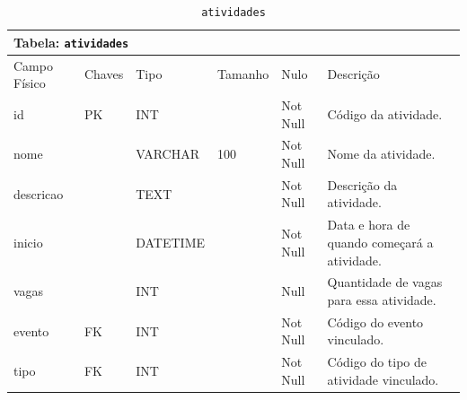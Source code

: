\documentclass[12pt,a4paper]{article}
\begin{document}
\begin{center}
\begin{table}[h!]
	\caption{\texttt{atividades}}
	\label{tabela:atividades}
	\begin{tabular}{|p{2.5cm}|p{1cm}|p{1.25cm}|p{1.75cm}|p{1.25cm}|p{5cm}|}\hline	
		\multicolumn{6}{|p{16cm}|}{\cellcolor{cinzaClaro}  \centering Tabela: \texttt{atividades}} \\ \hline %
		{\small Campo Físico}   & {\small Chaves} & {\small Tipo} & {\small Tamanho} & {\small Nulo} & {\small Descrição}\\\hline %
		
		{\tiny id}  & {\tiny PK} & {\tiny INT} & {\tiny } & {\tiny Not Null} &{\tiny Código da atividade.}\\\hline
		{\tiny nome}  & {\tiny } & {\tiny VARCHAR} & {\tiny 100} & {\tiny Not Null} &{\tiny Nome da atividade.}\\\hline
		{\tiny descricao}  & {\tiny } & {\tiny TEXT} & {\tiny } & {\tiny Not Null} &{\tiny Descrição da atividade.}\\\hline
		{\tiny inicio}  & {\tiny } & {\tiny DATETIME} & {\tiny } & {\tiny Not Null} &{\tiny Data e hora de quando começará a atividade.}\\\hline
		{\tiny vagas}  & {\tiny } & {\tiny INT} & {\tiny } & {\tiny Null} &{\tiny Quantidade de vagas para essa atividade.}\\\hline
		{\tiny evento}  & {\tiny FK} & {\tiny INT} & {\tiny } & {\tiny Not Null} &{\tiny Código do evento vinculado.}\\\hline
		{\tiny tipo}  & {\tiny FK} & {\tiny INT} & {\tiny } & {\tiny Not Null} &{\tiny Código do tipo de atividade vinculado.}\\\hline
		
			
	\end{tabular}
\end{table}	
\end{center}
\end{document}
